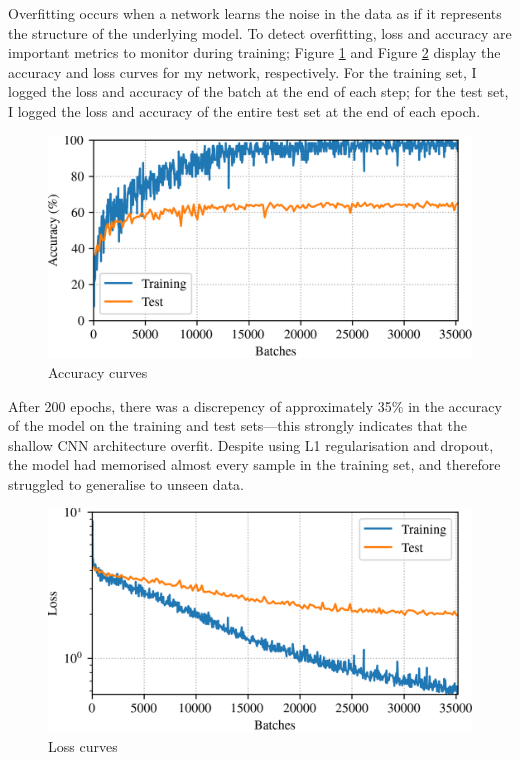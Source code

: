 \documentclass[conference]{IEEEtran}
\begin{document}
Overfitting occurs when a network learns the noise in the data as if it represents the structure of the underlying model.
To detect overfitting, loss and accuracy are important metrics to monitor during training; Figure \ref{accuracy_curves} and Figure \ref{loss_curves} display the accuracy and loss curves for my network, respectively.
For the training set, I logged the loss and accuracy of the batch at the end of each step; for the test set, I logged the loss and accuracy of the entire test set at the end of each epoch.

\begin{figure}[htbp]
    \centerline{\includegraphics[width=\columnwidth]{accuracy.png}}
    \caption{Accuracy curves}
    \label{accuracy_curves}
\end{figure}

After 200 epochs, there was a discrepency of approximately 35\% in the accuracy of the model on the training and test sets---this strongly indicates that the shallow CNN architecture overfit.
Despite using L1 regularisation and dropout, the model had memorised almost every sample in the training set, and therefore struggled to generalise to unseen data.

\begin{figure}[htbp]
    \centerline{\includegraphics[width=\columnwidth]{loss.png}}
    \caption{Loss curves}
    \label{loss_curves}
\end{figure}
\end{document}
